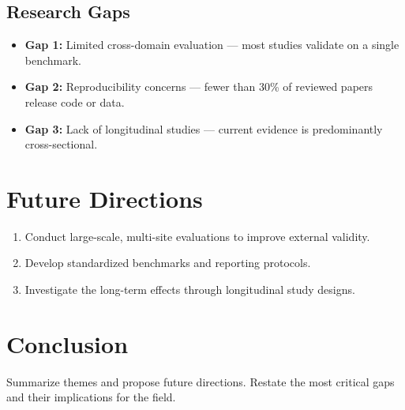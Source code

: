 \documentclass[11pt]{article}
\begin{document}
\subsection{Research Gaps}
\begin{itemize}
  \item \textbf{Gap 1:} Limited cross-domain evaluation --- most studies validate on a single benchmark.
  \item \textbf{Gap 2:} Reproducibility concerns --- fewer than 30\% of reviewed papers release code or data.
  \item \textbf{Gap 3:} Lack of longitudinal studies --- current evidence is predominantly cross-sectional.
\end{itemize}

\section{Future Directions}
\begin{enumerate}
  \item Conduct large-scale, multi-site evaluations to improve external validity.
  \item Develop standardized benchmarks and reporting protocols.
  \item Investigate the long-term effects through longitudinal study designs.
\end{enumerate}

\section{Conclusion}
Summarize themes and propose future directions. Restate the most critical gaps
and their implications for the field.



\end{document}
